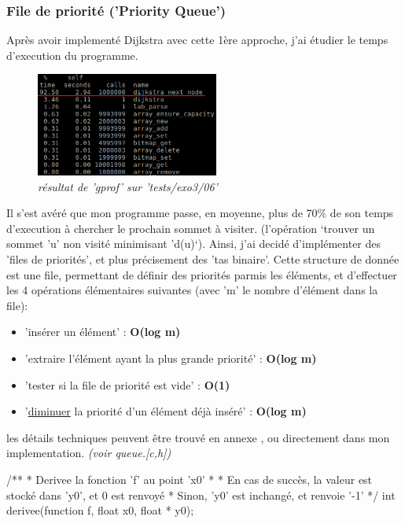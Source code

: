 \documentclass[10pt]{article}
\begin{document}
			\subsubsection{File de priorité ('Priority Queue')}
				Après avoir implementé Dijkstra avec cette 1ère approche, j'ai étudier le temps d'execution du programme.
				\begin{figure}[H]
					\begin{center}
						\includegraphics[width=6cm,height=\textheight,keepaspectratio]{./images/no_pqueue.png}
					\end{center}
				    \caption{\textit{résultat de 'gprof' sur 'tests/exo3/06'}}
				\end{figure}
				Il s'est avéré que mon programme passe, en moyenne,
				plus de 70\% de son temps d'execution à chercher le prochain sommet à visiter.
				(l'opération `trouver un sommet 'u' non visité minimisant 'd(u)`).\newline\newline
				Ainsi, j'ai decidé d'implémenter des 'files de priorités', et plus précisement des 'tas binaire'.
				Cette structure de donnée est une file, permettant de définir des priorités parmis les éléments,
				et d'effectuer les 4 opérations élémentaires suivantes (avec 'm' le nombre d'élément dans la file):
				\begin{itemize}[label=-]
					\item 'insérer un élément' : \textbf{O(log m)}
					\item 'extraire l'élément ayant la plus grande priorité' : \textbf{O(log m)}
					\item 'tester si la file de priorité est vide' : \textbf{O(1)}
					\item '\underline{diminuer} la priorité d'un élément déjà inséré' : \textbf{O(log m)}
				\end{itemize}
				les détails techniques peuvent être trouvé en annexe \cite{binary_heap},
				ou directement dans mon implementation. \textit{(voir queue.[c,h])}

/**
 *	Derivee la fonction 'f' au point 'x0'
 *
 *	En cas de succès, la valeur est stocké dans 'y0', et 0 est renvoyé
 *	Sinon, 'y0' est inchangé, et renvoie '-1'
 */
int derivee(function f, float x0, float * y0);
				
\end{document}
